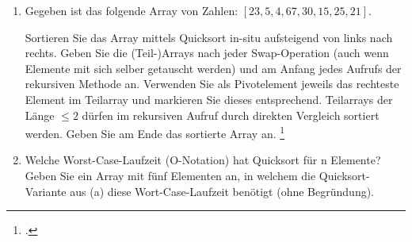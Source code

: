 \documentclass{bschlangaul-aufgabe}
\begin{document}

\begin{enumerate}


\item Gegeben ist das folgende Array von Zahlen: $[23, 5, 4, 67, 30, 15, 25, 21]$.

Sortieren Sie das Array mittels Quicksort in-situ aufsteigend von links
nach rechts. Geben Sie die (Teil-)Arrays nach jeder Swap-Operation (auch
wenn Elemente mit sich selber getauscht werden) und am Anfang jedes
Aufrufs der rekursiven Methode an. Verwenden Sie als Pivotelement
jeweils das rechteste Element im Teilarray und markieren Sie dieses
entsprechend. Teilarrays der Länge $\leq 2$ dürfen im rekursiven Aufruf
durch direkten Vergleich sortiert werden. Geben Sie am Ende das
sortierte Array an.
\footcite{examen:66115:2018:03}


\item Welche Worst-Case-Laufzeit (O-Notation) hat Quicksort für n
Elemente? Geben Sie ein Array mit fünf Elementen an, in welchem die
Quicksort-Variante aus (a) diese Wort-Case-Laufzeit benötigt (ohne
Begründung).

\end{enumerate}
\end{document}
